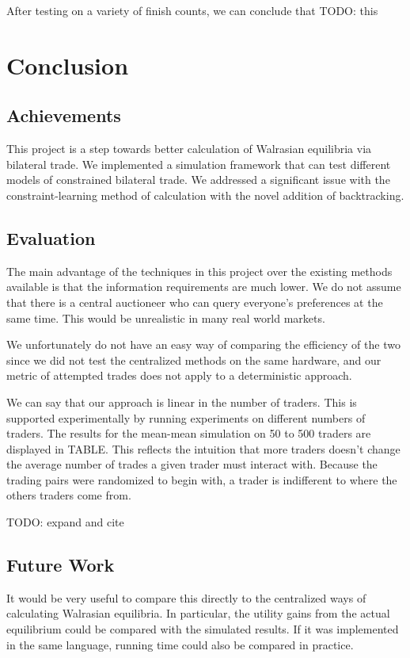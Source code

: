 \documentclass[12pt,a4paper,titlepage]{article}
\begin{document}
After testing on a variety of finish counts, we can conclude that
TODO: this

\section{Conclusion}\label{conclusion}

\subsection{Achievements}
This project is a step towards better calculation of Walrasian equilibria via bilateral trade.
We implemented a simulation framework that can test different models of constrained bilateral trade.
We addressed a significant issue with the constraint-learning method of calculation with the novel addition of backtracking.


\subsection{Evaluation}
The main advantage of the techniques in this project over the existing methods available is that the information requirements are much lower. 
We do not assume that there is a central auctioneer who can query everyone's preferences at the same time.
This would be unrealistic in many real world markets.

We unfortunately do not have an easy way of comparing the efficiency of the two since we did not test the centralized methods on the same hardware, and our metric of attempted trades does not apply to a deterministic approach.

We can say that our approach is linear in the number of traders. 
This is supported experimentally by running experiments on different numbers of traders.
The results for the mean-mean simulation on 50 to 500 traders are displayed in TABLE.
This reflects the intuition that more traders doesn't change the average number of trades a given trader must interact with.
Because the trading pairs were randomized to begin with, a trader is indifferent to where the others traders come from.

TODO: expand and cite


\subsection{Future Work}
It would be very useful to compare this directly to the centralized ways of calculating Walrasian equilibria.
In particular, the utility gains from the actual equilibrium could be compared with the simulated results.
If it was implemented in the same language, running time could also be compared in practice.
\end{document}
